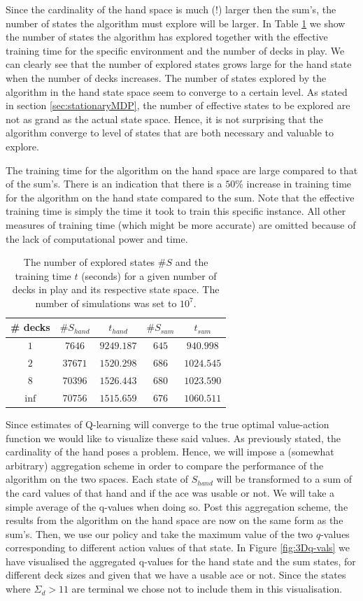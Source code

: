 Since the cardinality of the hand space is much (!) larger then the sum's, the number of states the algorithm must explore will be larger. In Table \ref{tab:state_visited} we show the number of states the algorithm has explored together with the effective training time for the specific environment and the number of decks in play. We can clearly see that the number of explored states grows large for the hand state when the number of decks increases. The number of states explored by the algorithm in the hand state space seem to converge to a certain level. As stated in section \ref{sec:stationaryMDP}, the number of effective states to be explored are not as grand as the actual state space. Hence, it is not surprising that the algorithm converge to level of states that are both necessary and valuable to explore. 

The training time for the algorithm on the hand space are large compared to that of the sum's. There is an indication that there is a $50\%$ increase in training time for the algorithm on the hand state compared to the sum. Note that the effective training time is simply the time it took to train this specific instance. All other measures of training time (which might be more accurate) are omitted because of the lack of computational power and time.
\begin{table}[h!]
\centering
 \begin{tabular}{c|cc|cc}
  \# decks & $\#S_{hand}$ & $t_{hand}$ & $\#S_{sum}$ &  $t_{sum}$  \\
  \hline 
  $1$ & $7646$ & $9249.187$ & $645$ & $940.998$ \\
  $2$ & $37671$ & $1520.298$ & $686$ & $1024.545$ \\
  $8$ & $70396$ & $1526.443$ & $680$ & $1023.590$ \\
  $\inf$ & $70756$ & $1515.659$ & $676$ & $1060.511$ 
 \end{tabular} 
 \caption{The number of explored states $\#S$ and the training time $t$ (seconds) for a given number of decks in play and its respective state space. The number of simulations was set to $10^7$.\label{tab:state_visited}}
\end{table}

Since estimates of Q-learning will converge to the true optimal value-action function we would like to visualize these said values. As previously stated, the cardinality of the hand poses a problem. Hence, we will impose a (somewhat arbitrary) aggregation scheme in order to compare the performance of the algorithm on the two spaces. Each state of $S_{hand}$ will be transformed to a sum of the card values of that hand and if the ace was usable or not. We will take a simple average of the q-values when doing so. Post this aggregation scheme, the results from the algorithm on the hand space are now on the same form as the sum's. Then, we use our policy and take the maximum value of the two $q$-values corresponding to different action values of that state. In Figure \ref{fig:3Dq-vals} we have visualised the aggregated q-values for the hand state and the sum states, for different deck sizes and given that we have a usable ace or not. Since the states where $\Sigma_d > 11$ are terminal we chose not to include them in this visualisation.

